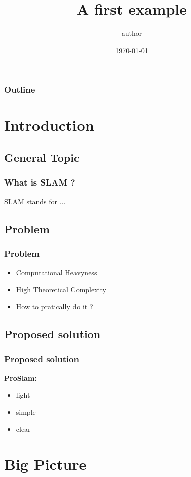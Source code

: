 \documentclass[16pt]{beamer}
\title {A first example}
\author{author}
\date{\today}
\begin{document}
\frame{\titlepage}

\begin{frame}
   \frametitle{Outline}
      \tableofcontents
\end{frame}

\section{ Introduction }

\subsection*{General Topic}
\begin{frame}
  \frametitle{What is SLAM ? }
  \begin{center}
  \end{center}
  SLAM stands for ...
\end{frame}


\subsection{Problem}
\begin{frame}
  \frametitle{Problem }
  \begin{itemize}
  \item Computational Heavyness
  \item High Theoretical Complexity
  \item How to pratically do it ?
  \end{itemize}
\end{frame}

\subsection{Proposed solution}
\begin{frame}
  \frametitle{Proposed solution }
 \textbf{ ProSlam: } \\
 \begin{itemize}
 \item light
 \item simple
 \item clear
 \end{itemize}
 
\end{frame}

\section{ Big Picture}
\end{document}
